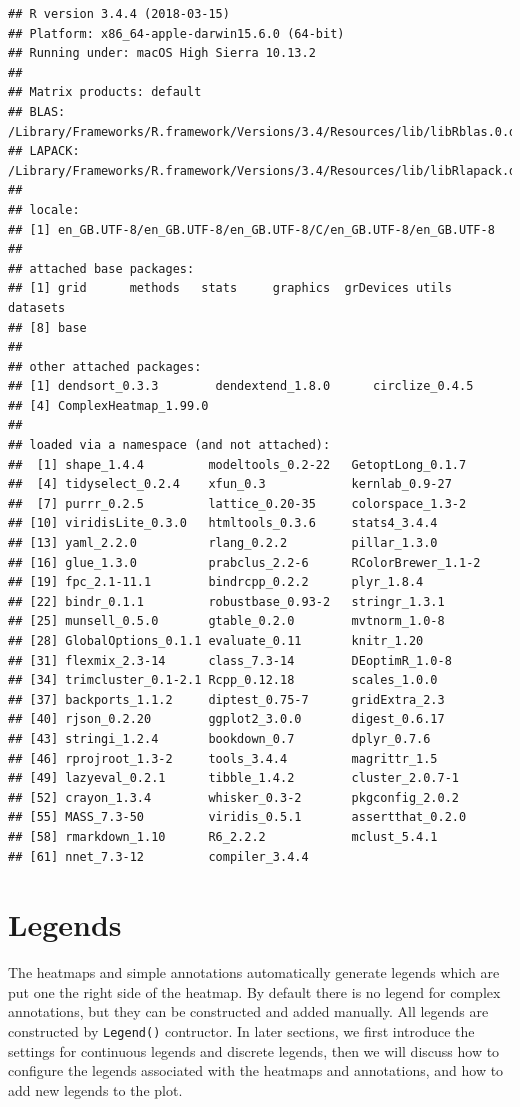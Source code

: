 \documentclass[]{book}
\theoremstyle{definition}
\theoremstyle{definition}
\theoremstyle{definition}
\theoremstyle{remark}
\begin{document}
\begin{verbatim}
## R version 3.4.4 (2018-03-15)
## Platform: x86_64-apple-darwin15.6.0 (64-bit)
## Running under: macOS High Sierra 10.13.2
## 
## Matrix products: default
## BLAS: /Library/Frameworks/R.framework/Versions/3.4/Resources/lib/libRblas.0.dylib
## LAPACK: /Library/Frameworks/R.framework/Versions/3.4/Resources/lib/libRlapack.dylib
## 
## locale:
## [1] en_GB.UTF-8/en_GB.UTF-8/en_GB.UTF-8/C/en_GB.UTF-8/en_GB.UTF-8
## 
## attached base packages:
## [1] grid      methods   stats     graphics  grDevices utils     datasets 
## [8] base     
## 
## other attached packages:
## [1] dendsort_0.3.3        dendextend_1.8.0      circlize_0.4.5       
## [4] ComplexHeatmap_1.99.0
## 
## loaded via a namespace (and not attached):
##  [1] shape_1.4.4         modeltools_0.2-22   GetoptLong_0.1.7   
##  [4] tidyselect_0.2.4    xfun_0.3            kernlab_0.9-27     
##  [7] purrr_0.2.5         lattice_0.20-35     colorspace_1.3-2   
## [10] viridisLite_0.3.0   htmltools_0.3.6     stats4_3.4.4       
## [13] yaml_2.2.0          rlang_0.2.2         pillar_1.3.0       
## [16] glue_1.3.0          prabclus_2.2-6      RColorBrewer_1.1-2 
## [19] fpc_2.1-11.1        bindrcpp_0.2.2      plyr_1.8.4         
## [22] bindr_0.1.1         robustbase_0.93-2   stringr_1.3.1      
## [25] munsell_0.5.0       gtable_0.2.0        mvtnorm_1.0-8      
## [28] GlobalOptions_0.1.1 evaluate_0.11       knitr_1.20         
## [31] flexmix_2.3-14      class_7.3-14        DEoptimR_1.0-8     
## [34] trimcluster_0.1-2.1 Rcpp_0.12.18        scales_1.0.0       
## [37] backports_1.1.2     diptest_0.75-7      gridExtra_2.3      
## [40] rjson_0.2.20        ggplot2_3.0.0       digest_0.6.17      
## [43] stringi_1.2.4       bookdown_0.7        dplyr_0.7.6        
## [46] rprojroot_1.3-2     tools_3.4.4         magrittr_1.5       
## [49] lazyeval_0.2.1      tibble_1.4.2        cluster_2.0.7-1    
## [52] crayon_1.3.4        whisker_0.3-2       pkgconfig_2.0.2    
## [55] MASS_7.3-50         viridis_0.5.1       assertthat_0.2.0   
## [58] rmarkdown_1.10      R6_2.2.2            mclust_5.4.1       
## [61] nnet_7.3-12         compiler_3.4.4
\end{verbatim}

\chapter{Legends}\label{legends}

The heatmaps and simple annotations automatically generate legends which
are put one the right side of the heatmap. By default there is no legend
for complex annotations, but they can be constructed and added manually.
All legends are constructed by \texttt{Legend()} contructor. In later
sections, we first introduce the settings for continuous legends and
discrete legends, then we will discuss how to configure the legends
associated with the heatmaps and annotations, and how to add new legends
to the plot.
\end{document}
